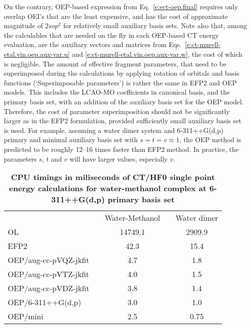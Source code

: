 \documentclass[aip,jcp,amsmath,amssymb,reprint,floatfix]{revtex4-1}
\begin{document}
%
On the contrary, 
OEP\hyp{}based expression
from Eq.~\eqref{e:ect-oep.final} requires only overlap OEI's that are the least expensive, 
and has the cost of approximate magnitude of $2sop^2$ for relatively small auxiliary basis sets.
Note also that, among the calculables that are needed on the fly in each
OEP\hyp{}based CT energy evaluation, are the auxiliary vectors and matrices 
from Eqs.~\eqref{e:ct-murell-etal.vin.oep.aux-var.u}
and \eqref{e:ct-murell-etal.vin.oep.aux-var.w},
the cost of which is negligible. The amount of effective fragment parameters,
that need to be superimposed during the calculations by applying rotation
of orbitals and basis functions (`Superimposable parameters')
is rather the same in EFP2 and OEP models. 
This includes the LCAO\hyp{}MO coefficients in canonical basis,
and the primary basis set, with an addition of the auxiliary basis set
for the OEP model. Therefore, the cost of parameter superimposition should
not be significantly larger as in the EFP2 formulation, provided sufficiently 
small auxiliary basis set is used.
For example,
assuming a water dimer system and 6-311++G(d,p) primary and minimal auxiliary basis set
with $s=t=v\approx1$,
the OEP method is predicted to be roughly 12--16 times faster than EFP2 method. In practice,
the parameters $s$, $t$ and $v$ will have larger values, especially $v$.

{
\renewcommand{\arraystretch}{1.4}
\begin{table}[h]
\caption[Minimal auxiliary basis set optimized for OEP\hyp{}based CT/HF0 calculations.]
{{\bf CPU timings in miliseconds of CT/HF0 single point energy calculations
for water-methanol complex at 6-311++G(d,p) primary basis set\footnotemark[1]}
}
\label{t:5}
\begin{ruledtabular}
\begin{tabular}{llccc}
                      && Water-Methanol && Water dimer \\
\cline{3-5}
OL                    &&14749.1 &&  2909.9\\     %
EFP2                  &&  42.3  &&    15.4\\
OEP/aug-cc-pVQZ-jkfit &&   4.7  &&     1.8\\
OEP/aug-cc-pVTZ-jkfit &&   4.0  &&     1.5\\
OEP/aug-cc-pVDZ-jkfit &&   3.8  &&     1.4\\
OEP/6-311++G(d,p)     &&   3.0  &&     1.0\\
OEP/mini\footnotemark[2]&& 2.5  &&     0.75\\
\end{tabular}
\end{ruledtabular}
%
%
\end{table}
}
%
\end{document}

